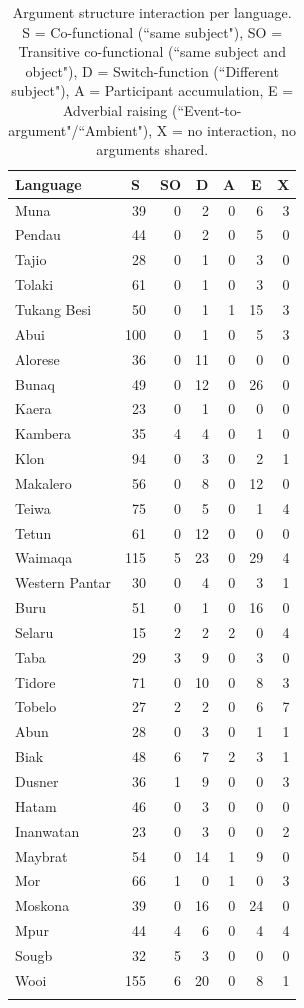 \begin{table}
\begin{tabular}{lrrrrrr}
  \lsptoprule
Language & \multicolumn{1}{c}{S} & \multicolumn{1}{c}{SO} & \multicolumn{1}{c}{D} & \multicolumn{1}{c}{A} & \multicolumn{1}{c}{E} & \multicolumn{1}{c}{X} \tabularnewline 
  \midrule
  Muna &  39 &   0 &   2 &   0 &   6 &   3 \tabularnewline 
  Pendau &  44 &   0 &   2 &   0 &   5 &   0 \tabularnewline 
  Tajio &  28 &   0 &   1 &   0 &   3 &   0 \tabularnewline 
  Tolaki &  61 &   0 &   1 &   0 &   3 &   0 \tabularnewline 
  Tukang Besi &  50 &   0 &   1 &   1 &  15 &   3 \tabularnewline 
  \midrule
  Abui & 100 &   0 &   1 &   0 &   5 &   3 \tabularnewline 
  Alorese &  36 &   0 &  11 &   0 &   0 &   0 \tabularnewline 
  Bunaq &  49 &   0 &  12 &   0 &  26 &   0 \tabularnewline 
  Kaera &  23 &   0 &   1 &   0 &   0 &   0 \tabularnewline 
  Kambera &  35 &   4 &   4 &   0 &   1 &   0 \tabularnewline 
  Klon &  94 &   0 &   3 &   0 &   2 &   1 \tabularnewline 
  Makalero &  56 &   0 &  8 &   0 &  12 &   0 \tabularnewline 
  Teiwa &  75 &   0 &   5 &   0 &   1 &   4 \tabularnewline 
  Tetun &  61 &   0 &  12 &   0 &   0 &   0 \tabularnewline 
  Waimaqa & 115 &   5 &  23 &   0 &  29 &   4 \tabularnewline 
  Western Pantar &  30 &   0 &   4 &   0 &   3 &   1 \tabularnewline 
  \midrule
  Buru & 51 & 0 & 1 & 0 & 16 & 0 \tabularnewline
  Selaru &  15 &   2 &   2 &   2 &   0 &   4 \tabularnewline 
  Taba &  29 &   3 &  9 &   0 &   3 &   0 \tabularnewline 
  Tidore & 71 & 0 & 10 & 0 & 8 & 3 \tabularnewline
  Tobelo &  27 &   2 &   2 &   0 &   6 &  7 \tabularnewline 
  \midrule
  Abun &  28 &   0 &   3 &   0 &   1 &   1 \tabularnewline 
  Biak &  48 &   6 &  7 &   2 &   3 &   1 \tabularnewline 
  Dusner &  36 &   1 &  9 &   0 &   0 &   3 \tabularnewline 
  Hatam &  46 &   0 &  3 &   0 &   0 &   0 \tabularnewline 
  Inanwatan &  23 &   0 &   3 &   0 &   0 &   2 \tabularnewline 
  Maybrat &  54 &   0 &  14 &   1 &  9 &   0 \tabularnewline 
  Mor &  66 &   1 &   0 &   1 &   0 &  3 \tabularnewline 
  Moskona &  39 &   0 &  16 &   0 &  24 &   0 \tabularnewline 
  Mpur &  44 &   4 &   6 &   0 &   4 &   4 \tabularnewline 
  Sougb &  32 &   5 &   3 &   0 &   0 &   0 \tabularnewline 
  Wooi & 155 &   6 &  20 &   0 &   8 &   1 \tabularnewline 
   \lspbottomrule
\end{tabular}
\caption[Argument structure interaction per language]{Argument structure interaction per language. S = Co-functional (``same subject"), SO = Transitive co-functional (``same subject and object"), D = Switch-function (``Different subject"), A = Participant accumulation, E = Adverbial raising (``Event-to-argument"/``Ambient"), X = no interaction, no arguments shared.}
\label{table:Referentiality_per_lang}
\end{table}

